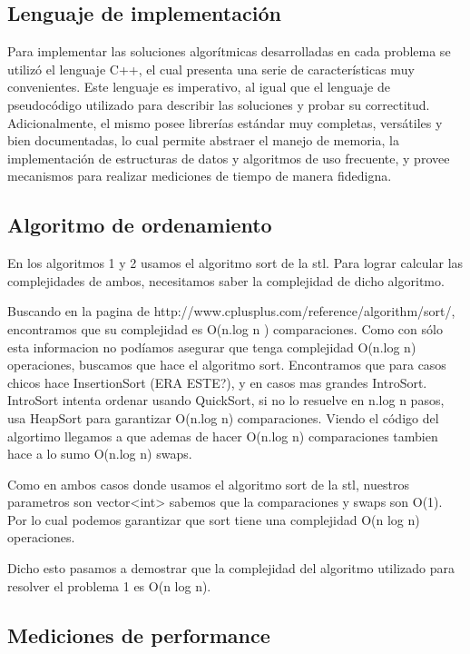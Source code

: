 \subsection{Lenguaje de implementación}

Para implementar las soluciones algorítmicas desarrolladas en cada problema se utilizó el lenguaje C++, el cual presenta una serie de características muy convenientes. Este lenguaje es imperativo, al igual que el lenguaje de pseudocódigo utilizado para describir las soluciones y probar su correctitud. Adicionalmente, el mismo posee librerías estándar muy completas, versátiles y bien documentadas, lo cual permite abstraer el manejo de memoria, la implementación de estructuras de datos y algoritmos de uso frecuente, y provee mecanismos para realizar mediciones de tiempo de manera fidedigna.

\subsection{Algoritmo de ordenamiento}

En los algoritmos 1 y 2 usamos el algoritmo sort de la stl. Para lograr calcular las complejidades de ambos, necesitamos saber la complejidad de dicho algoritmo.

Buscando en la pagina de http://www.cplusplus.com/reference/algorithm/sort/, encontramos que su complejidad es O(n.log n ) comparaciones. Como con sólo esta informacion no podíamos asegurar que tenga complejidad O(n.log n) operaciones, buscamos que hace el algoritmo sort. Encontramos que para casos chicos hace InsertionSort (ERA ESTE?), y en casos mas grandes IntroSort. IntroSort intenta ordenar usando QuickSort, si no lo resuelve en n.log n pasos, usa HeapSort para garantizar O(n.log n) comparaciones. Viendo el código del algortimo llegamos a que ademas de hacer O(n.log n) comparaciones tambien hace a lo sumo O(n.log n) swaps.

Como en ambos casos donde usamos el algoritmo sort de la stl, nuestros parametros son vector<int> sabemos que la comparaciones y swaps son O(1). Por lo cual podemos garantizar que sort tiene una complejidad O(n log n) operaciones.

Dicho esto pasamos a demostrar que la complejidad del algoritmo utilizado para resolver el problema 1 es O(n log n).

\subsection{Mediciones de performance}

